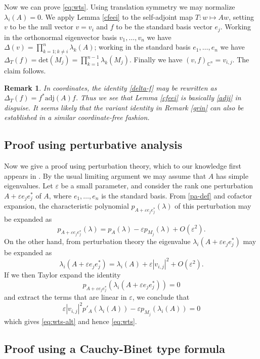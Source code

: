 \documentclass[12pt]{amsart}
\newcommand\C{\mathbb{C}}
\newcommand\eps{\varepsilon}
\newtheorem{remark}[lemma]{Remark}
\begin{document}
Now we can prove \eqref{eq:wts}.  Using translation symmetry we may normalize $\lambda_i(A)=0$.  We apply Lemma \ref{cfeei} to the self-adjoint map $T: w \mapsto Aw$, setting $v$ to be the null vector $v = v_i$ and $f$ to be the standard basis vector $e_j$.  Working in the orthonormal eigenvector basis $v_1,\dots,v_n$ we have $\Delta(v) = \prod_{k=1; k \neq i}^n \lambda_k(A)$; working in the standard basis $e_1,\dots,e_n$ we have $\Delta_T(f) = \mathrm{det}( M_j ) = \prod_{k=1}^{n-1} \lambda_k(M_j)$.  Finally we have $(v,f)_{\C^n} = v_{i,j}$.  The claim follows.

\begin{remark} In coordinates, the identity \eqref{delta-f} may be rewritten as $\Delta_T(f) = f^* \mathrm{adj}(A) f$.  Thus we see that Lemma \ref{cfeei} is basically \eqref{adji} in disguise.  It seems likely that the variant identity in Remark \ref{grin} can also be established in a similar coordinate-free fashion.
\end{remark}


\subsection{Proof using perturbative analysis}\label{perturbative-sec}

Now we give a proof using perturbation theory, which to our knowledge first appears in \cite{Mukherjee1989}.  By the usual limiting argument we may assume that $A$ has simple eigenvalues.  Let $\eps$ be a small parameter, and consider the rank one perturbation $A + \eps e_j e_j^*$ of $A$, where $e_1,\dots,e_n$ is the standard basis.  From \eqref{pa-def} and cofactor expansion, the characteristic polynomial $p_{A+\eps e_j e_j^*}(\lambda)$ of this perturbation may be expanded as
$$ p_{A+\eps e_j e_j^*}(\lambda) = p_A(\lambda) - \eps p_{M_j}(\lambda) + O(\eps^2).$$
On the other hand, from perturbation theory the eigenvalue $\lambda_i( A+\eps e_j e_j^* )$ may be expanded as
$$ \lambda_i( A+\eps e_j e_j^* ) = \lambda_i(A) + \eps |v_{i,j}|^2 + O(\eps^2).$$
If we then Taylor expand the identity
$$ p_{A + \eps e_j e_j^*}( \lambda_i( A+\eps e_j e_j^* ) ) = 0$$
and extract the terms that are linear in $\eps$, we conclude that
$$ \eps |v_{i,j}|^2 p'_A(\lambda_i(A)) - \eps p_{M_j}(\lambda_i(A)) = 0$$
which gives \eqref{eq:wts-alt} and hence \eqref{eq:wts}.


\subsection{Proof using a Cauchy-Binet type formula}\label{cauchy-binet-sec}
\end{document}
